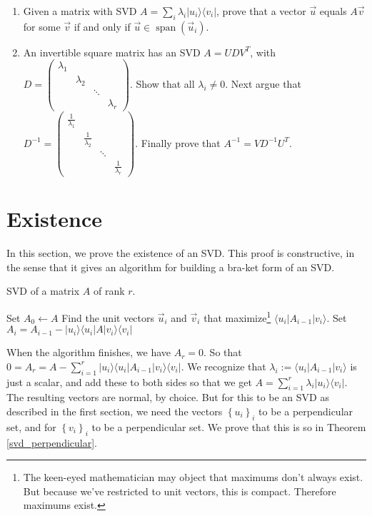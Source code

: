 \documentclass{amsbook}
\begin{document}
\begin{enumerate}
\item \label{Ex-SVD Range} Given a matrix with SVD $A=\sum_i\lambda_i|u_i\rangle\langle v_i|$, prove that a vector $\vec u$ equals $A\vec v$ for some $\vec v$ if and only if $\vec u\in\operatorname{span}\left(\vec u_i\right)$.
\item An invertible square matrix has an SVD $A=UDV^T$, with $D=\left(\begin{array}{cccc}\lambda_1&&&\\ &\lambda_2&&\\ &&\ddots&\\ &&&\lambda_r\end{array}\right)$.  Show that all $\lambda_i\neq0$.  Next argue that $D^{-1}=\left(\begin{array}{cccc}\frac{1}{\lambda_1}&&&\\&\frac{1}{\lambda_2}&&\\&&\ddots&\\&&&\frac{1}{\lambda_r}\end{array}\right)$.  Finally prove that $A^{-1}=VD^{-1}U^T$.
\end{enumerate}

\section{Existence}

In this section, we prove the existence of an SVD.  This proof is constructive, in the sense that it gives an algorithm for building a bra-ket form of an SVD.

\begin{algorithm}
\caption{SVD of a matrix $A$ of rank $r$.}
\label{alg1}
\begin{algorithmic}
\State Set $A_0 \gets A$
	\State Find the unit vectors $\vec u _i$ and $\vec v _i$ that maximize\footnote{The keen-eyed mathematician may object that maximums don't always exist.  But because we've restricted to unit vectors, this is compact.  Therefore maximums exist.} $\langle u _i|A_{i-1}| v _i\rangle$.
	\State Set $A_i = A_{i-1}-| u _i\rangle\langle u _i|A| v _i\rangle\langle v _i|$
\EndWhile
\end{algorithmic}
\end{algorithm}

When the algorithm finishes, we have $A_r=0$.  So that $0=A_r=A-\sum_{i=1}^r| u _i\rangle\langle u _i|A_{i-1}| v _i\rangle\langle v _i|$.  We recognize that $\lambda_i:=\langle u _i|A_{i-1}| v _i\rangle$ is just a scalar, and add these to both sides so that we get $A=\sum_{i=1}^r\lambda_i| u _i\rangle\langle v _i|$.  The resulting vectors are normal, by choice.  But for this to be an SVD as described in the first section, we need the vectors $\left\{u_i\right\}_i$ to be a perpendicular set, and for $\left\{v_i\right\}_i$ to be a perpendicular set.  We prove that this is so in Theorem \ref{svd_perpendicular}.
\end{document}
